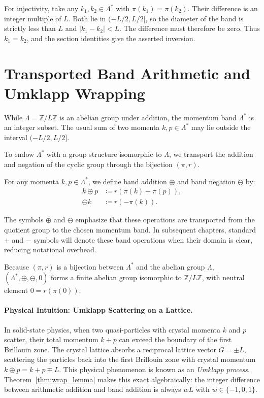 \begin{remark}
For injectivity, take any $k_1,k_2\in\Lambda^*$ with $\pi(k_1)=\pi(k_2)$. Their difference is an integer multiple of $L$. Both lie in $(-L/2,L/2]$, so the diameter of the band is strictly less than $L$ and $|k_1-k_2|<L$. The difference must therefore be zero. Thus $k_1=k_2$, and the section identities give the asserted inversion.
\end{remark}

\section{Transported Band Arithmetic and Umklapp Wrapping}

While $\Lambda = \mathbb{Z}/L\mathbb{Z}$ is an abelian group under addition, the momentum band $\Lambda^*$ is an integer subset. The usual sum of two momenta $k, p \in \Lambda^*$ may lie outside the interval $(-L/2, L/2]$. 

To endow $\Lambda^*$ with a group structure isomorphic to $\Lambda$, we transport the addition and negation of the cyclic group through the bijection $(\pi, r)$.

\begin{definition}
For any momenta $k, p \in \Lambda^*$, we define band addition $\oplus$ and band negation $\ominus$ by:
\begin{align}
k \oplus p &\coloneqq r(\pi(k) + \pi(p)), \\
\ominus k &\coloneqq r(-\pi(k)).
\end{align}
\end{definition}

\begin{remark}
The symbols $\oplus$ and $\ominus$ emphasize that these operations are transported from the quotient group to the chosen momentum band. In subsequent chapters, standard $+$ and $-$ symbols will denote these band operations when their domain is clear, reducing notational overhead.
\end{remark}

Because $(\pi, r)$ is a bijection between $\Lambda^*$ and the abelian group $\Lambda$, $(\Lambda^*, \oplus, \ominus, 0)$ forms a finite abelian group isomorphic to $\mathbb{Z}/L\mathbb{Z}$, with neutral element $0 = r(\pi(0))$.

\paragraph{Physical Intuition: Umklapp Scattering on a Lattice.}
In solid-state physics, when two quasi-particles with crystal momenta $k$ and $p$ scatter, their total momentum $k+p$ can exceed the boundary of the first Brillouin zone. The crystal lattice absorbs a reciprocal lattice vector $G = \pm L$, scattering the particles back into the first Brillouin zone with crystal momentum $k \oplus p = k + p \mp L$. This physical phenomenon is known as an \emph{Umklapp process}. Theorem~\ref{thm:wrap_lemma} makes this exact algebraically: the integer difference between arithmetic addition and band addition is always $w L$ with $w \in \{-1, 0, 1\}$.

